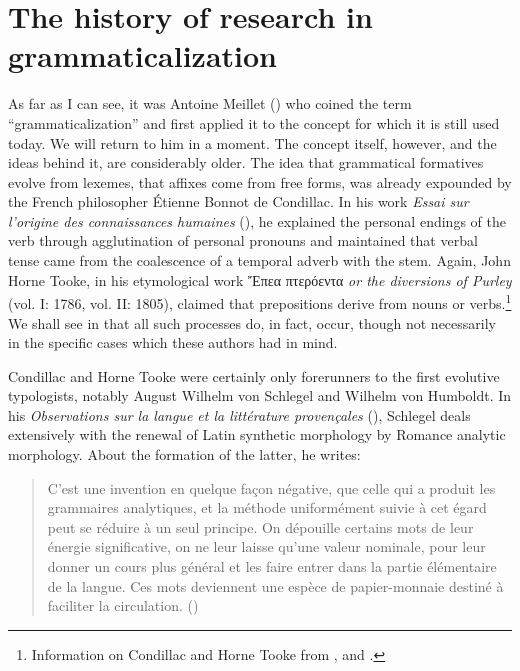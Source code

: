 \chapter{The history of research in grammaticalization} \label{chap:1}

As far as I can see, it was Antoine Meillet (\citeyear{Meillet1912}) who coined the term ``grammaticalization'' and first applied it to the concept for which it is still used today. We will return to him in a moment. The concept itself, however, and the ideas behind it, are considerably older. The idea that grammatical formatives evolve from lexemes, that affixes come from free forms, was already expounded by the French philosopher Étienne Bonnot de Condillac. In his work \textit{Essai sur l'origine des connaissances humaines} (\citeyear{Condillac1746}), he explained the personal endings of the verb through agglutination of personal pronouns and maintained that verbal tense came from the coalescence of a temporal adverb with the stem. Again, John Horne Tooke, in his etymological work Ἔπεα πτερόεντα \textit{or the diversions of Purley} (vol. I: 1786, vol. II: 1805), claimed that prepositions derive from nouns or verbs.\footnote{Information on Condillac and Horne Tooke from \citet[109f, 132--134]{Arens1969}, and \citet[119, 452f]{Stammerjohann1975}.} We shall see in  that all such processes do, in fact, occur, though not necessarily in the specific cases which these authors had in mind.

Condillac and Horne Tooke were certainly only forerunners to the first evolutive typologists, notably August Wilhelm von Schlegel and Wilhelm von Humboldt. In his \textit{Observations sur la langue et la littérature provençales} (\citeyear{Schlegel1818}), Schlegel deals extensively with the renewal of Latin synthetic morphology by Romance analytic morphology. About the formation of the latter, he writes:

\begin{quote}
C'est une invention en quelque façon négative, que celle qui a produit les grammaires analytiques, et la méthode uniformément suivie à cet égard peut se réduire à un seul principe. On dépouille certains mots de leur énergie significative, on ne leur laisse qu'une valeur nominale, pour leur donner un cours plus général et les faire entrer dans la partie élémentaire de la langue. Ces mots deviennent une espèce de papier-monnaie destiné à faciliter la circulation. (\citeyear[28]{Schlegel1818})
\end{quote}

